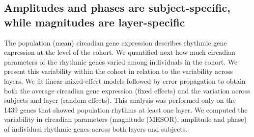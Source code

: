 

\subsection*{Amplitudes and phases are subject-specific, while magnitudes are layer-specific}
The population (mean) circadian gene expression describes rhythmic gene expression at the level of the cohort. We quantified next how much circadian parameters of the rhythmic genes varied among individuals in the cohort. We present this variability within the cohort in relation to the variability across layers.  We fit linear-mixed-effect models \cite{Hoffman2016} followed by error propagation to obtain both the average circadian gene expression (fixed effects) and the variation across subjects and layer (random effects). This analysis was performed only on the 1439 genes that showed population rhythms at least one layer. We computed the variability in circadian parameters (magnitude (MESOR), amplitude and phase) of individual rhythmic genes across both layers and subjects.


